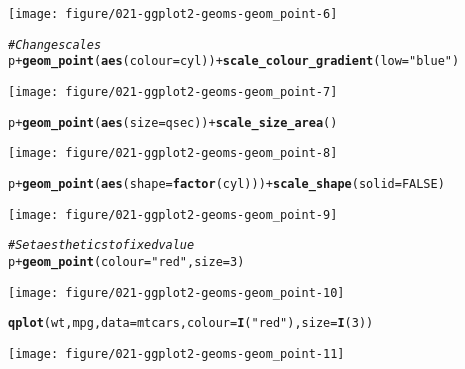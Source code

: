 \documentclass[a4paper,titlepage]{tufte-handout}\usepackage[]{graphicx}\usepackage[]{color}
\makeatletter
\def\maxwidth{ %
  \ifdim\Gin@nat@width>\linewidth
    \linewidth
  \else
    \Gin@nat@width
  \fi
}
\newcommand{\hlnum}[1]{\textcolor[rgb]{0.686,0.059,0.569}{#1}}%
\newcommand{\hlstr}[1]{\textcolor[rgb]{0.192,0.494,0.8}{#1}}%
\newcommand{\hlcom}[1]{\textcolor[rgb]{0.678,0.584,0.686}{\textit{#1}}}%
\newcommand{\hlopt}[1]{\textcolor[rgb]{0,0,0}{#1}}%
\newcommand{\hlstd}[1]{\textcolor[rgb]{0.345,0.345,0.345}{#1}}%
\newcommand{\hlkwc}[1]{\textcolor[rgb]{0.333,0.667,0.333}{#1}}%
\newcommand{\hlkwd}[1]{\textcolor[rgb]{0.737,0.353,0.396}{\textbf{#1}}}%
\newenvironment{kframe}{%
 \def\at@end@of@kframe{}%
 \ifinner\ifhmode%
  \def\at@end@of@kframe{\end{minipage}}%
  \begin{minipage}{\columnwidth}%
 \fi\fi%
 \def\FrameCommand##1{\hskip\@totalleftmargin \hskip-\fboxsep
 \colorbox{shadecolor}{##1}\hskip-\fboxsep
     \hskip-\linewidth \hskip-\@totalleftmargin \hskip\columnwidth}%
 \MakeFramed {\advance\hsize-\width
   \@totalleftmargin\z@ \linewidth\hsize
   \@setminipage}}%
 {\par\unskip\endMakeFramed%
 \at@end@of@kframe}
\newenvironment{knitrout}{}{} %
\makeatother
\begin{document}
\begin{knitrout}
\begin{kframe}
\begin{alltt}
\end{alltt}
\end{kframe}
\texttt{[image: figure/021-ggplot2-geoms-geom\_point-6]} 
\begin{kframe}\begin{alltt}
\hlcom{# Change scales}
\hlstd{p} \hlopt{+} \hlkwd{geom_point}\hlstd{(}\hlkwd{aes}\hlstd{(}\hlkwc{colour} \hlstd{= cyl))} \hlopt{+} \hlkwd{scale_colour_gradient}\hlstd{(}\hlkwc{low} \hlstd{=} \hlstr{"blue"}\hlstd{)}
\end{alltt}
\end{kframe}
\texttt{[image: figure/021-ggplot2-geoms-geom\_point-7]} 
\begin{kframe}\begin{alltt}
\hlstd{p} \hlopt{+} \hlkwd{geom_point}\hlstd{(}\hlkwd{aes}\hlstd{(}\hlkwc{size} \hlstd{= qsec))} \hlopt{+} \hlkwd{scale_size_area}\hlstd{()}
\end{alltt}
\end{kframe}
\texttt{[image: figure/021-ggplot2-geoms-geom\_point-8]} 
\begin{kframe}\begin{alltt}
\hlstd{p} \hlopt{+} \hlkwd{geom_point}\hlstd{(}\hlkwd{aes}\hlstd{(}\hlkwc{shape} \hlstd{=} \hlkwd{factor}\hlstd{(cyl)))} \hlopt{+} \hlkwd{scale_shape}\hlstd{(}\hlkwc{solid} \hlstd{=} \hlnum{FALSE}\hlstd{)}
\end{alltt}
\end{kframe}
\texttt{[image: figure/021-ggplot2-geoms-geom\_point-9]} 
\begin{kframe}\begin{alltt}
\hlcom{# Set aesthetics to fixed value}
\hlstd{p} \hlopt{+} \hlkwd{geom_point}\hlstd{(}\hlkwc{colour} \hlstd{=} \hlstr{"red"}\hlstd{,} \hlkwc{size} \hlstd{=} \hlnum{3}\hlstd{)}
\end{alltt}
\end{kframe}
\texttt{[image: figure/021-ggplot2-geoms-geom\_point-10]} 
\begin{kframe}\begin{alltt}
\hlkwd{qplot}\hlstd{(wt, mpg,} \hlkwc{data} \hlstd{= mtcars,} \hlkwc{colour} \hlstd{=} \hlkwd{I}\hlstd{(}\hlstr{"red"}\hlstd{),} \hlkwc{size} \hlstd{=} \hlkwd{I}\hlstd{(}\hlnum{3}\hlstd{))}
\end{alltt}
\end{kframe}
\texttt{[image: figure/021-ggplot2-geoms-geom\_point-11]} 
\begin{kframe}\begin{alltt}

\end{alltt}
\end{kframe}
\end{knitrout}
\end{document}
